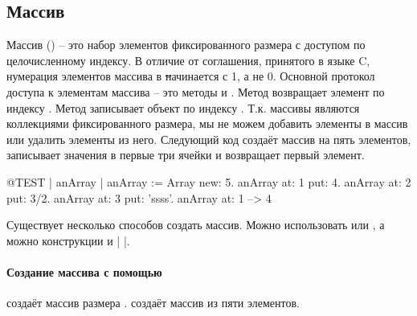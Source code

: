 \documentclass[a4paper,10pt,twoside]{book}
\begin{document}
\subsection{Массив}
Массив () -- это набор элементов фиксированного размера с доступом по целочисленному индексу.
В отличие от соглашения, принятого в языке C, нумерация элементов массива в \st начинается с 1, а не 0.
Основной протокол доступа к элементам массива -- это методы  и . Метод  возвращает элемент по индексу . Метод  записывает объект  по индексу . Т.к. массивы являются коллекциями фиксированного размера, мы не можем добавить элементы в массив или удалить элементы из него. Следующий код создаёт массив на пять элементов, записывает значения в первые три ячейки и возвращает первый элемент.

\begin{code}{@TEST | anArray | }
anArray := Array new: 5.
anArray at: 1 put: 4.
anArray at: 2 put: 3/2.
anArray at: 3 put: 'ssss'.
anArray at: 1 --> 4
\end{code}

Существует несколько способов создать массив. Можно использовать   или , а можно конструкции \ct{#( )} и \ct|{ }|.

\paragraph{Создание массива с помощью }  создаёт массив размера .
 создаёт массив из пяти элементов.
\end{document}
